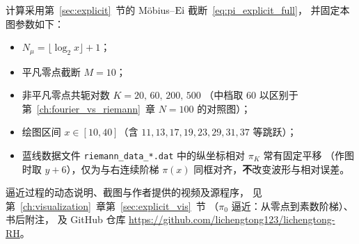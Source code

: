 计算采用第~\ref{sec:explicit}~节的 Möbius--$\operatorname{Ei}$ 截断~\eqref{eq:pi_explicit_full}，
并固定本图参数如下：
\begin{itemize}
  \item $N_{\mu}=\lfloor\log_2 x\rfloor+1$；
  \item 平凡零点截断 $M = 10$；
  \item 非平凡零点共轭对数 $K = 20,\, 60,\, 200,\, 500$
        （中档取 $60$ 以区别于第~\ref{ch:fourier_vs_riemann}~章 $N=100$ 的对照图）；
  \item 绘图区间 $x \in [10, 40]$（含 $11,13,17,19,23,29,31,37$ 等跳跃）；
  \item 蓝线数据文件 \texttt{riemann\_data\_*.dat} 中的纵坐标相对 $\pi_K$ 常有固定平移
        （作图时取 $y+6$），仅为与右连续阶梯 $\pi(x)$ 同框对齐，\textbf{不}改变波形与相对误差。
\end{itemize}
逼近过程的动态说明、截图与作者提供的视频及源程序，
见第~\ref{ch:visualization}~章第~\ref{sec:explicit_vis}~节
（$\pi_0$ 逼近：从零点到素数阶梯）、书后附注，
及 GitHub 仓库 \url{https://github.com/lichengtong123/lichengtong-RH}。

